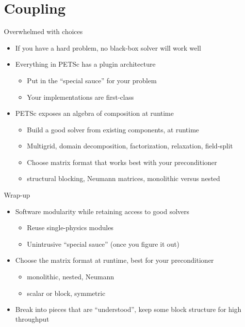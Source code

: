\documentclass{beamer}
\begin{document}
\section{Coupling}

\begin{frame}{Overwhelmed with choices}
  \begin{itemize}
  \item If you have a hard problem, no black-box solver will work well
  \item Everything in PETSc has a plugin architecture
    \begin{itemize}
    \item Put in the ``special sauce'' for your problem
    \item Your implementations are first-class
    \end{itemize}
  \item PETSc exposes an algebra of composition at runtime
    \begin{itemize}
    \item Build a good solver from existing components, at runtime
    \item Multigrid, domain decomposition, factorization, relaxation, field-split
    \item Choose matrix format that works best with your preconditioner
    \item structural blocking, Neumann matrices, monolithic versus nested
    \end{itemize}
  \end{itemize}
\end{frame}




\begin{frame}{Wrap-up}
  \begin{itemize}
  \item Software modularity while retaining access to good solvers
    \begin{itemize}
    \item Reuse single-physics modules
    \item Unintrusive ``special sauce'' (once you figure it out)
    \end{itemize}
  \item Choose the matrix format at runtime, best for your preconditioner
    \begin{itemize}
    \item monolithic, nested, Neumann
    \item scalar or block, symmetric
    \end{itemize}
  \item Break into pieces that are ``understood'', keep some block structure for high throughput
  \end{itemize}
\end{frame}
\end{document}
